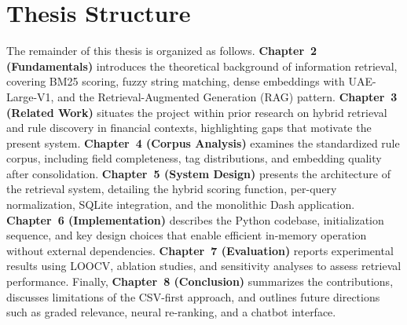 \section{Thesis Structure}
The remainder of this thesis is organized as follows. \textbf{Chapter~2 (Fundamentals)} introduces the theoretical background of information retrieval, covering BM25 scoring, fuzzy string matching, dense embeddings with UAE-Large-V1, and the Retrieval-Augmented Generation (RAG) pattern. \textbf{Chapter~3 (Related Work)} situates the project within prior research on hybrid retrieval and rule discovery in financial contexts, highlighting gaps that motivate the present system. \textbf{Chapter~4 (Corpus Analysis)} examines the standardized rule corpus, including field completeness, tag distributions, and embedding quality after consolidation. \textbf{Chapter~5 (System Design)} presents the architecture of the retrieval system, detailing the hybrid scoring function, per-query normalization, SQLite integration, and the monolithic Dash application. \textbf{Chapter~6 (Implementation)} describes the Python codebase, initialization sequence, and key design choices that enable efficient in-memory operation without external dependencies. \textbf{Chapter~7 (Evaluation)} reports experimental results using LOOCV, ablation studies, and sensitivity analyses to assess retrieval performance. Finally, \textbf{Chapter~8 (Conclusion)} summarizes the contributions, discusses limitations of the CSV-first approach, and outlines future directions such as graded relevance, neural re-ranking, and a chatbot interface.
